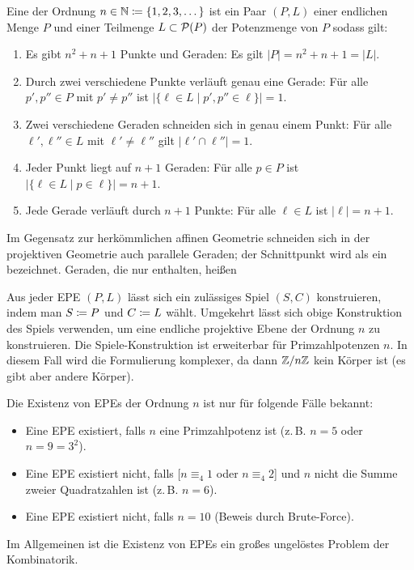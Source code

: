 \documentclass[paper=81mm:81mm,fontsize=10.7pt]{scrartcl}
\begin{document}
Eine  der Ordnung $n \in \mathbb{N} \coloneqq \{1, 2, 3, \dotsc\}$
ist ein Paar $(P, L)$
einer endlichen Menge $P$  und
einer Teilmenge $L \subset \mathcal{P}(P)$ der Potenzmenge von $P$ 
sodass gilt:
\begin{enumerate}[label=P\arabic*.]
  \item
  Es gibt $n^2 + n + 1$ Punkte und Geraden:
  Es gilt $|P| = n^2 + n + 1 = |L|$.

  \item
  Durch zwei verschiedene Punkte verläuft genau eine Gerade:
  Für alle $p', p'' \in P$ mit $p' \not= p''$ ist $|\{\ell \in L \mid p', p'' \in \ell\}| = 1$.

  \item
  Zwei verschiedene Geraden schneiden sich in genau einem Punkt:
  Für alle $\ell', \ell'' \in L$ mit $\ell' \not= \ell''$ gilt $|\ell' \cap \ell''| = 1$.

  \item
  Jeder Punkt liegt auf $n + 1$ Geraden:
  Für alle $p \in P$ ist $|\{\ell \in L \mid p \in \ell\}| = n + 1$.

  \item
  Jede Gerade verläuft durch $n + 1$ Punkte:
  Für alle $\ell \in L$ ist $|\ell| = n + 1$.
\end{enumerate}

Im Gegensatz zur herkömmlichen affinen Geometrie schneiden sich in der projektiven Geometrie
auch parallele Geraden; der Schnittpunkt wird als ein  bezeichnet.
Geraden, die nur  enthalten, heißen 

Aus jeder EPE $(P, L)$ lässt sich ein zulässiges Spiel $(S, C)$
konstruieren, indem man $S \coloneqq P$ und $C \coloneqq L$ wählt.
Umgekehrt lässt sich obige Konstruktion des Spiels verwenden, um eine endliche projektive Ebene
der Ordnung $n$ zu konstruieren.
Die Spiele-Konstruktion ist erweiterbar für Primzahlpotenzen $n$.
In diesem Fall wird die Formulierung komplexer, da dann $\mathbb{Z}/n\mathbb{Z}$ kein Körper ist
(es gibt aber andere Körper).

Die Existenz von EPEs der Ordnung $n$ ist nur für folgende Fälle bekannt:

\begin{itemize}
  \item
  Eine EPE existiert, falls $n$ eine Primzahlpotenz ist (z.\,B. $n = 5$ oder $n = 9 = 3^2$).

  \item
  Eine EPE existiert nicht, falls [$n \equiv_4 1$ oder $n \equiv_4 2$] und
  $n$ nicht die Summe zweier Quadratzahlen ist (z.\,B. $n = 6$).

  \item
  Eine EPE existiert nicht, falls $n = 10$ (Beweis durch Brute-Force).
\end{itemize}
Im Allgemeinen ist die Existenz von EPEs ein großes ungelöstes Problem der Kombinatorik.
\end{document}
